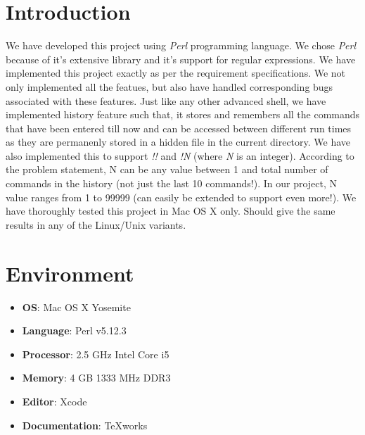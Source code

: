 \documentclass[12pt,twoside]{article}
\begin{document}
\section{Introduction}
We have developed this project using \emph{Perl} programming language. We chose \emph{Perl} because of it's extensive library and it's support for regular expressions. We have implemented this project exactly as per the requirement specifications. We not only implemented all the featues, but also have handled corresponding bugs associated with these features. Just like any other advanced shell, we have implemented history feature such that, it stores and remembers all the commands that have been entered till now and can be accessed between different run times as they are permanenly stored in a hidden file in the current directory. We have also implemented this to support \emph{!!} and \emph{!N} (where \emph{N} is an integer). According to the problem statement, N can be any value between 1 and total number of commands in the history (not just the last 10 commands!). In our project, N value ranges from 1 to 99999 (can easily be extended to support even more!). We have thoroughly tested this project in Mac OS X only. Should give the same results in any of the Linux/Unix variants.


\section{Environment}
\begin{itemize}
    \item \textbf{OS}: Mac OS X Yosemite
    \item \textbf{Language}: Perl v5.12.3
    \item \textbf{Processor}: 2.5 GHz Intel Core i5
    \item \textbf{Memory}: 4 GB 1333 MHz DDR3
    \item \textbf{Editor}: Xcode
    \item \textbf{Documentation}: TeXworks
\end{itemize}
\end{document}
